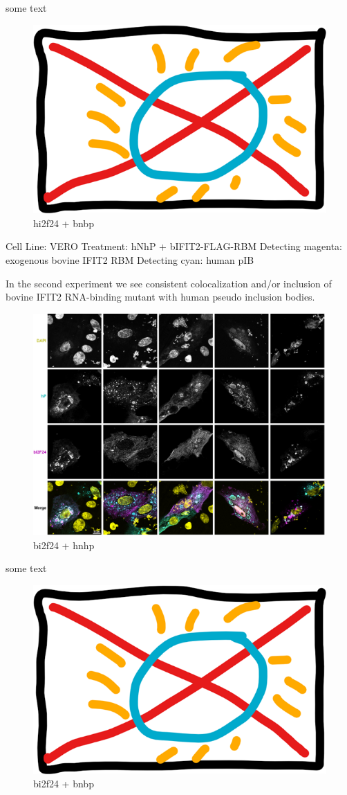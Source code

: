 some text

\begin{figure}
    \centering
    \includegraphics[width=0.5\linewidth]{10. Chapter 5//Figs//04. IFIT2-mutant confocal/00. placeholder.png}
    \caption[hi2f24 + bnbp]{hi2f24 + bnbp}
    \label{hi2f24 + bnbp}
\end{figure}

Cell Line: VERO
Treatment: hNhP + bIFIT2-FLAG-RBM
Detecting magenta: exogenous bovine IFIT2 RBM
Detecting cyan: human pIB

In the second experiment we see consistent colocalization and/or inclusion of bovine IFIT2 RNA-binding mutant with human pseudo inclusion bodies.

\begin{figure}
    \centering
    \includegraphics[width=0.5\linewidth]{10. Chapter 5/Figs/04. IFIT2-mutant confocal/02. bi2f hnhp.png}
    \caption[bi2f24 + hnhp]{bi2f24 + hnhp}
    \label{bi2f24 + hnhp}
\end{figure}

some text

\begin{figure}
    \centering
    \includegraphics[width=0.5\linewidth]{10. Chapter 5//Figs//04. IFIT2-mutant confocal/00. placeholder.png}
    \caption[bi2f24 + bnbp]{bi2f24 + bnbp}
    \label{bi2f24 + bnbp}
\end{figure}


